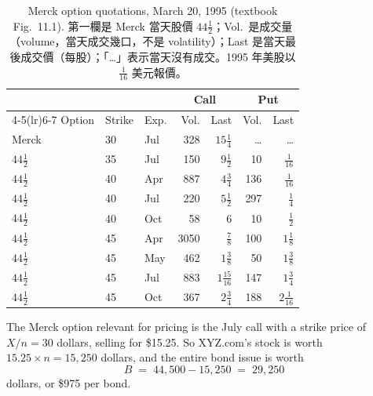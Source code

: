 \begin{table}[H]
	\centering
	\small
	\begin{tabular}{lllrrrr}
		\toprule
		         &        &      & \multicolumn{2}{c}{Call} & \multicolumn{2}{c}{Put}                                   \\
		\cmidrule(lr){4-5}\cmidrule(lr){6-7}
		Option   & Strike & Exp. & Vol.                     & Last                    & Vol.  & Last                     \\
		\midrule
		Merck    & 30     & Jul  & 328                      & $15\frac14$             & \ldots & \ldots                  \\
		$44\frac12$ & 35  & Jul  & 150                      & $9\frac12$              & 10    & $\frac1{16}$             \\
		$44\frac12$ & 40  & Apr  & 887                      & $4\frac34$              & 136   & $\frac1{16}$             \\
		$44\frac12$ & 40  & Jul  & 220                      & $5\frac12$              & 297   & $\frac14$                \\
		$44\frac12$ & 40  & Oct  & 58                       & $6$                     & 10    & $\frac12$                \\
		$44\frac12$ & 45  & Apr  & 3050                     & $\frac78$               & 100   & $1\frac18$               \\
		$44\frac12$ & 45  & May  & 462                      & $1\frac38$              & 50    & $1\frac38$               \\
		$44\frac12$ & 45  & Jul  & 883                      & $1\frac{15}{16}$        & 147   & $1\frac34$               \\
		$44\frac12$ & 45  & Oct  & 367                      & $2\frac34$              & 188   & $2\frac1{16}$            \\
		\bottomrule
	\end{tabular}
	\caption{Merck option quotations, March 20, 1995 (textbook Fig.~11.1).
		第一欄是 Merck 當天股價 $44\frac12$；Vol.\ 是成交量（volume，當天成交幾口，不是 volatility）；Last 是當天最後成交價（每股）；「\ldots」表示當天沒有成交。1995 年美股以 $\frac1{16}$ 美元報價。}
	\label{tab:merck}
\end{table}

The Merck option relevant for pricing is the July call with a strike price of $X/n=30$ dollars, selling for \$15.25.
So XYZ.com's stock is worth $15.25\times n=15{,}250$ dollars, and the entire bond issue is worth
\[
	B \;=\; 44{,}500-15{,}250 \;=\; 29{,}250
\]
dollars, or \$975 per bond.

